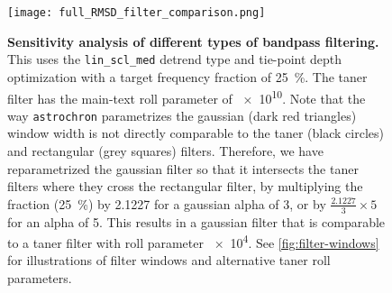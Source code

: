 \documentclass[draft]{agujournal2019}
\begin{document}
\begin{figure}[htb]
  \centering \texttt{[image: full\_RMSD\_filter\_comparison.png]}
  \caption{\label{fig:full-RMSD-filter}
    \textbf{Sensitivity analysis of different types of bandpass filtering.}
    This uses the \texttt{lin\_scl\_med} detrend type and tie-point depth optimization with a target frequency fraction of \qty{25}{\percent}.
    The taner filter has the main-text roll parameter of \num{e10}.
    Note that the way \texttt{astrochron} parametrizes the gaussian (dark red triangles) window width is not directly comparable to the taner (black circles) and rectangular (grey squares) filters.
    Therefore, we have reparametrized the gaussian filter so that it intersects the taner filters where they cross the rectangular filter,
    by multiplying the fraction (\qty{25}{\percent})
    by \num{2.1227} for a gaussian alpha of 3,
    or by \(\frac{2.1227}{3}\times5\) for an alpha of 5.
    This results in a gaussian filter that is comparable to a taner filter with roll parameter \num{e4}.
    See \cref{fig:filter-windows} for illustrations of filter windows and alternative taner roll parameters.
    }
\end{figure}
\end{document}
